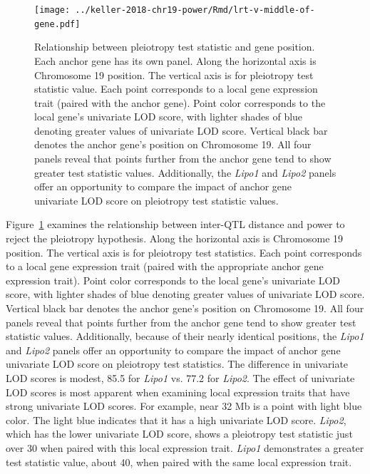 \documentclass[oneside]{book}\usepackage[]{graphicx}\usepackage[]{color}
\begin{document}
\begin{figure}
    \centering
    \texttt{[image: ../keller-2018-chr19-power/Rmd/lrt-v-middle-of-gene.pdf]}
    \caption[Pleiotropy LRT vs. chromosomal position plots reveal that higher values of pleiotropy LRT tend to correspond to greater interlocus distance and greater univariate LOD score.]{Relationship between pleiotropy test statistic and gene position. Each anchor gene has its own panel. Along the horizontal axis is Chromosome 19 position. The vertical axis is for pleiotropy test statistic value. Each point corresponds to a local gene expression trait (paired with the anchor gene). Point color corresponds to the local gene's univariate LOD score, with lighter shades of blue denoting greater values of univariate LOD score. Vertical black bar denotes the anchor gene's position on Chromosome 19. All four panels reveal that points further from the anchor gene tend to show greater test statistic values. Additionally, the \emph{Lipo1} and \emph{Lipo2} panels offer an opportunity to compare the impact of anchor gene univariate LOD score on pleiotropy test statistic values.}
    \label{fig:middle}
\end{figure}

Figure~\ref{fig:middle} examines the relationship between inter-QTL distance and power to reject the pleiotropy hypothesis.
Along the horizontal axis is Chromosome 19 position. 
The vertical axis is for pleiotropy test statistics. 
Each point corresponds to a local gene expression trait (paired with the appropriate anchor gene expression trait). 
Point color corresponds to the local gene's univariate LOD score, with lighter shades of blue denoting greater values of univariate LOD score. 
Vertical black bar denotes the anchor gene's position on Chromosome 19. 
All four panels reveal that points further from the anchor gene tend to show greater test statistic values. 
Additionally, because of their nearly identical positions, the \emph{Lipo1} and \emph{Lipo2} panels offer an opportunity to compare the impact 
of anchor gene univariate LOD score on pleiotropy test statistics.
The difference in univariate LOD scores is modest, 85.5 for \emph{Lipo1} vs. 77.2 for \emph{Lipo2}. The effect of univariate LOD scores is most apparent when examining local expression traits that have strong univariate LOD scores. 
For example, near 32 Mb is a point with light blue color. The light blue indicates that it has a high univariate LOD score. 
\emph{Lipo2}, which has the lower univariate LOD score, shows a pleiotropy test statistic just over 30 when paired with this local expression trait. 
\emph{Lipo1} demonstrates a greater test statistic value, about 40, when paired with the same local expression trait.
\end{document}
